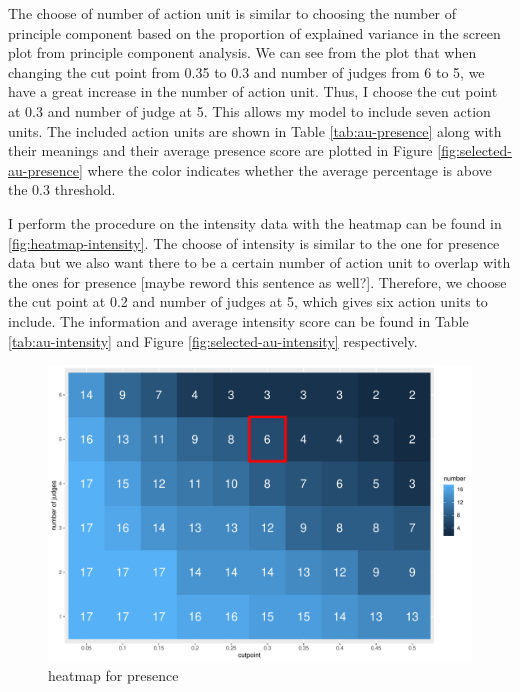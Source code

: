 \documentclass{monashthesis}
\begin{document}
The choose of number of action unit is similar to choosing the number of principle component based on the proportion of explained variance in the screen plot from principle component analysis. We can see from the plot that when changing the cut point from 0.35 to 0.3 and number of judges from 6 to 5, we have a great increase in the number of action unit. Thus, I choose the cut point at 0.3 and number of judge at 5. This allows my model to include seven action units. The included action units are shown in Table \ref{tab:au-presence} along with their meanings and their average presence score are plotted in Figure \ref{fig:selected-au-presence} where the color indicates whether the average percentage is above the 0.3 threshold.

I perform the procedure on the intensity data with the heatmap can be found in \ref{fig:heatmap-intensity}. The choose of intensity is similar to the one for presence data but we also want there to be a certain number of action unit to overlap with the ones for presence {[}maybe reword this sentence as well?{]}. Therefore, we choose the cut point at 0.2 and number of judges at 5, which gives six action units to include. The information and average intensity score can be found in Table \ref{tab:au-intensity} and Figure \ref{fig:selected-au-intensity} respectively.

\begin{figure}

{\centering \includegraphics[width=1\linewidth]{figures/heatmap-presence-1} 

}

\caption{heatmap for presence}\label{fig:heatmap-presence}
\end{figure}
\end{document}
